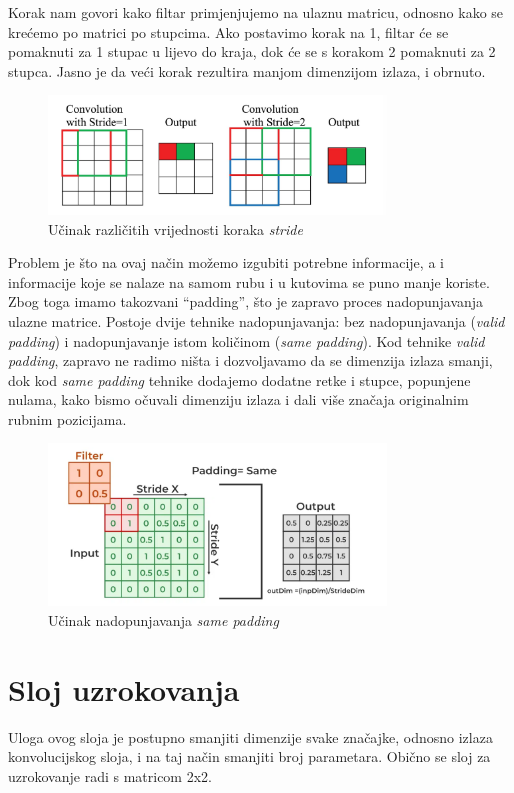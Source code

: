 Korak nam govori kako filtar primjenjujemo na ulaznu matricu, odnosno kako se krećemo po matrici po stupcima.
Ako postavimo korak na 1, filtar će se pomaknuti za 1 stupac u lijevo do kraja, dok će se s korakom 2 pomaknuti za 2 stupca.
Jasno je da veći korak rezultira manjom dimenzijom izlaza, i obrnuto.
\FloatBarrier
\begin{figure}[h]
    \centering
    \includegraphics[width=0.8\textwidth]{images/Stride}
    \caption{Učinak različitih vrijednosti koraka \emph{stride}}
    \label{fig:slika14}
\end{figure}
\FloatBarrier

Problem je što na ovaj način možemo izgubiti potrebne informacije, a i informacije koje se nalaze na samom rubu i u kutovima se puno manje koriste.
Zbog toga imamo takozvani \enquote{padding}, što je zapravo proces nadopunjavanja ulazne matrice.
Postoje dvije tehnike nadopunjavanja: bez nadopunjavanja (\emph{valid padding}) i nadopunjavanje istom količinom (\emph{same padding}).
Kod tehnike \emph{valid padding}, zapravo ne radimo ništa i dozvoljavamo da se dimenzija izlaza smanji, dok kod \emph{same padding} tehnike dodajemo dodatne retke i stupce, popunjene nulama, kako bismo očuvali dimenziju izlaza i dali više značaja originalnim rubnim pozicijama.

\FloatBarrier
\begin{figure}[h]
    \centering
    \includegraphics[width=0.8\textwidth]{images/Padding}
    \caption{Učinak nadopunjavanja \emph{same padding}}
    \label{fig:slika15}
\end{figure}
\FloatBarrier

\section{Sloj uzrokovanja}\label{sec:sloj-uzrokovanja}
Uloga ovog sloja je postupno smanjiti dimenzije svake značajke, odnosno izlaza konvolucijskog sloja, i na taj način smanjiti broj parametara.
Obično se sloj za uzrokovanje radi s matricom 2x2.

